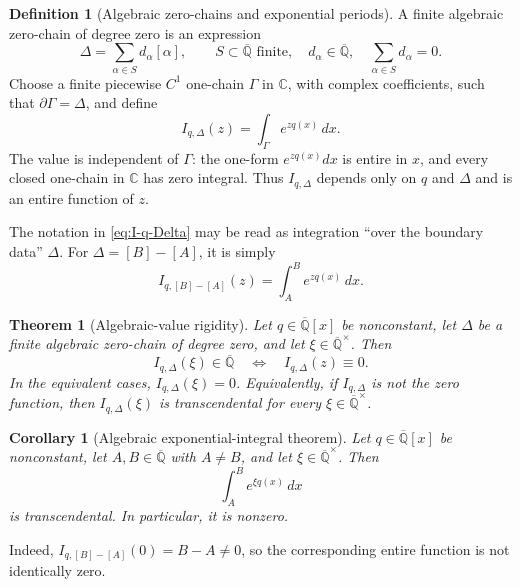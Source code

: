 \documentclass[11pt]{article}
\numberwithin{equation}{section}
\newtheorem{theorem}{Theorem}[section]
\newtheorem{corollary}[corollary]{Corollary}
\theoremstyle{definition}
\newtheorem{definition}[definition]{Definition}
\theoremstyle{remark}
\newcommand{\C}{\mathbb C}
\newcommand{\Qbar}{\overline{\mathbb Q}}
\begin{document}
\begin{definition}[Algebraic zero-chains and exponential periods]
\label{def:zero-chain}
A finite algebraic zero-chain of degree zero is an expression
\begin{equation}\label{eq:zero-chain}
  \Delta=\sum_{\alpha\in S}d_\alpha[\alpha],
  \qquad
  S\subset\Qbar\text{ finite},\quad
  d_\alpha\in\Qbar,\quad
  \sum_{\alpha\in S}d_\alpha=0.
\end{equation}
Choose a finite piecewise $C^1$ one-chain $\Gamma$ in $\C$, with complex
coefficients, such that $\partial\Gamma=\Delta$, and define
\begin{equation}\label{eq:I-q-Delta}
  I_{q,\Delta}(z)=\int_\Gamma e^{zq(x)}\,dx.
\end{equation}
The value is independent of $\Gamma$: the one-form $e^{zq(x)}dx$ is entire in
$x$, and every closed one-chain in $\C$ has zero integral.  Thus
$I_{q,\Delta}$ depends only on $q$ and $\Delta$ and is an entire function of
$z$.
\end{definition}

The notation in \eqref{eq:I-q-Delta} may be read as integration ``over the
boundary data'' $\Delta$.  For $\Delta=[B]-[A]$, it is simply
\[
  I_{q,[B]-[A]}(z)=\int_A^B e^{zq(x)}\,dx.
\]

\begin{theorem}[Algebraic-value rigidity]\label{thm:algebraic-value-rigidity}
Let $q\in\Qbar[x]$ be nonconstant, let $\Delta$ be a finite algebraic
zero-chain of degree zero, and let $\xi\in\Qbar^\times$.  Then
\begin{equation}\label{eq:dichotomy}
  I_{q,\Delta}(\xi)\in\Qbar
  \quad\Longleftrightarrow\quad
  I_{q,\Delta}(z)\equiv0.
\end{equation}
In the equivalent cases, $I_{q,\Delta}(\xi)=0$.  Equivalently, if
$I_{q,\Delta}$ is not the zero function, then $I_{q,\Delta}(\xi)$ is
transcendental for every $\xi\in\Qbar^\times$.
\end{theorem}

\begin{corollary}[Algebraic exponential-integral theorem]
\label{cor:single-integral}
Let $q\in\Qbar[x]$ be nonconstant, let $A,B\in\Qbar$ with $A\ne B$, and let
$\xi\in\Qbar^\times$.  Then
\[
  \int_A^B e^{\xi q(x)}\,dx
\]
is transcendental.  In particular, it is nonzero.
\end{corollary}

Indeed, $I_{q,[B]-[A]}(0)=B-A\ne0$, so the corresponding entire function is
not identically zero.
\end{document}
